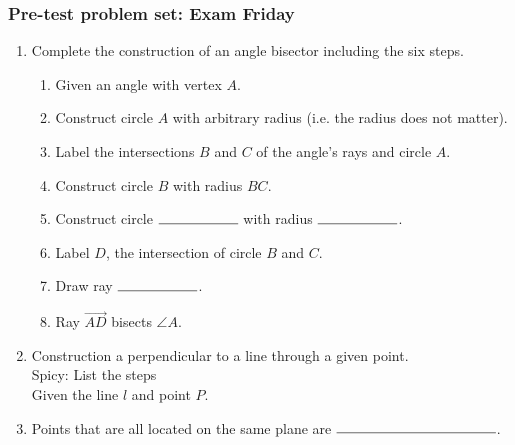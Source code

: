 \documentclass[12pt, oneside]{article}
\begin{document}
\subsubsection*{Pre-test problem set: Exam Friday}
  \vspace{0.5cm}
  \begin{enumerate}

  \item Complete the construction of an angle bisector including the six steps.
    \begin{enumerate}
      \item Given an angle with vertex $A$.
      \item Construct circle $A$ with arbitrary radius (i.e. the radius does not matter).
      \item Label the intersections $B$ and $C$ of the angle's rays and circle $A$.
      \item Construct circle $B$  with radius $BC$. \bigskip
      \item Construct circle $\rule{2cm}{0.15mm}$  with radius $\rule{2cm}{0.15mm}$. \bigskip
      \item Label $D$, the intersection of circle $B$ and $C$. \bigskip
      \item Draw ray $\rule{2cm}{0.15mm}$.
      \bigskip
      \item Ray $\overrightarrow {AD}$ bisects $\angle A$.
    \end{enumerate}
    \vspace{3cm}
    \begin{center}
    \end{center}
\newpage

  \item Construction a perpendicular to a line through a given point.\\
    Spicy: List the steps\\[0.5cm]
    \hspace{1cm} Given the line  $l$ and point $P$.
    \vspace{10cm}
    \begin{center}
    \end{center}
\newpage
  \item Points that are all located on the same plane are $\rule{4cm}{0.15mm}$. \bigskip


\end{enumerate}
\end{document}
